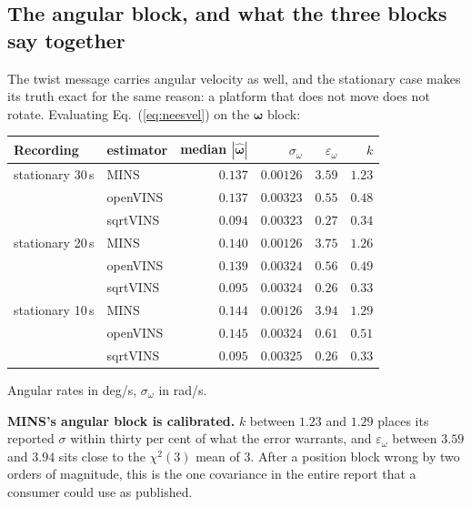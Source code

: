 \subsection{The angular block, and what the three blocks say together}
\label{sec:neesangulaire}

The twist message carries angular velocity as well, and the stationary case
makes its truth exact for the same reason: a platform that does not move
does not rotate. Evaluating Eq.~(\ref{eq:neesvel}) on the
$\boldsymbol{\omega}$ block:

\begin{center}
\begin{tabular}{@{}llrrrr@{}}
\toprule
Recording & estimator & median $|\hat{\boldsymbol{\omega}}|$ & $\sigma_\omega$ & $\varepsilon_\omega$ & $k$ \\
\midrule
stationary 30\,s & MINS     & $0.137$ & $0.00126$ & $3.59$ & $\mathbf{1.23}$ \\
                 & openVINS & $0.137$ & $0.00323$ & $0.55$ & $0.48$ \\
                 & sqrtVINS & $0.094$ & $0.00323$ & $0.27$ & $0.34$ \\
\midrule
stationary 20\,s & MINS     & $0.140$ & $0.00126$ & $3.75$ & $\mathbf{1.26}$ \\
                 & openVINS & $0.139$ & $0.00324$ & $0.56$ & $0.49$ \\
                 & sqrtVINS & $0.095$ & $0.00324$ & $0.26$ & $0.33$ \\
\midrule
stationary 10\,s & MINS     & $0.144$ & $0.00126$ & $3.94$ & $\mathbf{1.29}$ \\
                 & openVINS & $0.145$ & $0.00324$ & $0.61$ & $0.51$ \\
                 & sqrtVINS & $0.095$ & $0.00325$ & $0.26$ & $0.33$ \\
\bottomrule
\end{tabular}
\end{center}

\noindent Angular rates in deg/s, $\sigma_\omega$ in rad/s.

\textbf{MINS's angular block is calibrated.} $k$ between $1.23$ and $1.29$
places its reported $\sigma$ within thirty per cent of what the error
warrants, and $\varepsilon_\omega$ between $3.59$ and $3.94$ sits close to
the $\chi^2(3)$ mean of $3$. After a position block wrong by two orders of
magnitude, this is the one covariance in the entire report that a consumer
could use as published.

